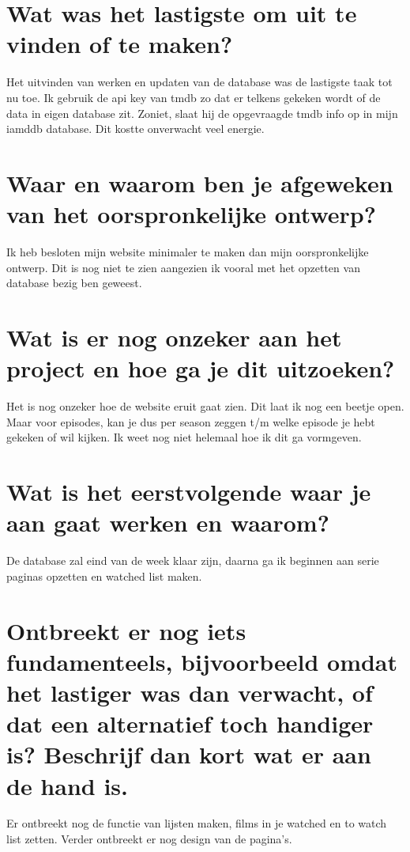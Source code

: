 \documentclass[11pt]{article}
\author{nerd}
\date{\today}
\title{}
\begin{document}
\tableofcontents

\section{Wat was het lastigste om uit te vinden of te maken?}
\label{sec:orga2f137c}
Het uitvinden van werken en updaten van de database was de lastigste taak tot nu toe. Ik gebruik de api key van tmdb zo dat er telkens gekeken wordt of de data in eigen database zit. Zoniet, slaat hij de opgevraagde tmdb info op in mijn iamddb database.
Dit kostte onverwacht veel energie.
\section{Waar en waarom ben je afgeweken van het oorspronkelijke ontwerp?}
\label{sec:org68a53df}
Ik heb besloten mijn website minimaler te maken dan mijn oorspronkelijke ontwerp. Dit is nog niet te zien aangezien ik vooral met het opzetten van database bezig ben geweest.
\section{Wat is er nog onzeker aan het project en hoe ga je dit uitzoeken?}
\label{sec:org99be607}
Het is nog onzeker hoe de website eruit gaat zien. Dit laat ik nog een beetje open. Maar voor episodes, kan je dus per season zeggen t/m welke episode je hebt gekeken of wil kijken. Ik weet nog niet helemaal hoe ik dit ga vormgeven.
\section{Wat is het eerstvolgende waar je aan gaat werken en waarom?}
\label{sec:orgb6a49bb}
De database zal eind van de week klaar zijn, daarna ga ik beginnen aan serie paginas opzetten en watched list maken. 
\section{Ontbreekt er nog iets fundamenteels, bijvoorbeeld omdat het lastiger was dan verwacht, of dat een alternatief toch handiger is? Beschrijf dan kort wat er aan de hand is.}
\label{sec:org54d7253}
Er ontbreekt nog de functie van lijsten maken, films in je watched en to watch list zetten. Verder ontbreekt er nog design van de pagina's.
\end{document}
